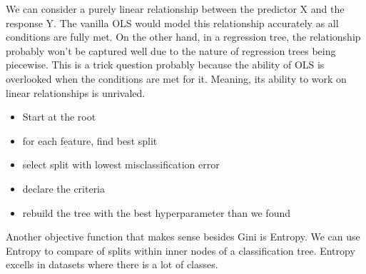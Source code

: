 \documentclass[12pt]{article}
\begin{document}
\begin{enumerate}
\begin{itemize}
\end{itemize}


We can consider a purely linear relationship between the predictor X and the response Y. The vanilla OLS would model this relationship accurately as all conditions are fully met. On the other hand, in a regression tree, the relationship probably won't be captured well due to the nature of regression trees being piecewise. This is a trick question probably because the ability of OLS is overlooked when the conditions are met for it. Meaning, its ability to work on linear relationships is unrivaled.


\begin{itemize}
    \item Start at the root
    \item for each feature, find best split
    \item select split with lowest misclassification error 
    \item declare the criteria
    \item rebuild the tree with the best hyperparameter than we found
\end{itemize}


Another objective function that makes sense besides Gini is Entropy. We can use Entropy to compare  of splits within inner nodes of a classification tree. Entropy excells in datasets where there is a lot of classes.
\end{enumerate}
\end{document}
